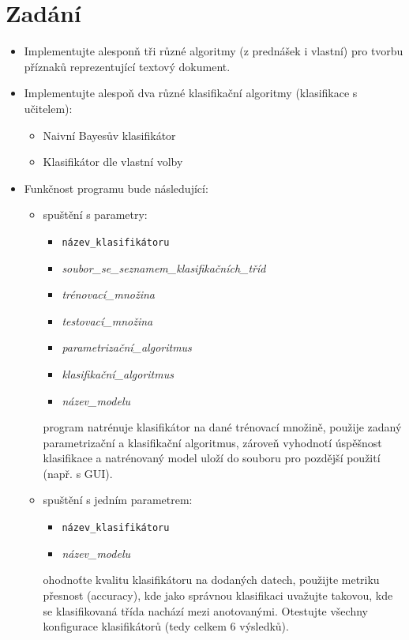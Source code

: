 \documentclass[
12pt,
a4paper,
pdftex,
czech,
titlepage
]{report}
\begin{document}
\chapter{Zadání}
\begin{itemize}
\item{Implementujte alesponň tři různé algoritmy (z prednášek i vlastní) pro tvorbu příznaků reprezentující textový dokument.}
\item{Implementujte alespoň dva různé klasifikační algoritmy (klasifikace s učitelem): 
\begin{itemize}
\item{Naivní Bayesův klasifikátor}
\item{Klasifikátor dle vlastní volby}
\end{itemize} } 
\item{Funkčnost programu bude následující:
\begin{itemize}
\item{spuštění s parametry:
\begin{itemize}
\item{\texttt{název\_klasifikátoru}}
\item{\textit{soubor\_se\_seznamem\_klasifikačních\_tříd}}
\item{\textit{trénovací\_množina}}
\item{\textit{testovací\_množina}}
\item{\textit{parametrizační\_algoritmus}}
\item{\textit{klasifikační\_algoritmus}}
\item{\textit{název\_modelu}}
\end{itemize} 
program natrénuje klasifikátor na dané trénovací množině, použije zadaný parametrizační a klasifikační algoritmus, zároveň vyhodnotí úspěšnost klasifikace a natrénovaný model uloží do souboru pro pozdější použití (např. s GUI).}
\item{spuštění s jedním parametrem:
\begin{itemize}
\item{\texttt{název\_klasifikátoru}}
\item{\textit{název\_modelu}}
\end{itemize}
ohodnoťte kvalitu klasifikátoru na dodaných datech, použijte metriku přesnost (accuracy), kde jako správnou klasifikaci uvažujte takovou, kde se klasifikovaná třída nachází mezi anotovanými. Otestujte všechny konfigurace klasifikátorů (tedy celkem 6 výsledků).}
\end{itemize} }
\end{itemize}
\end{document}

